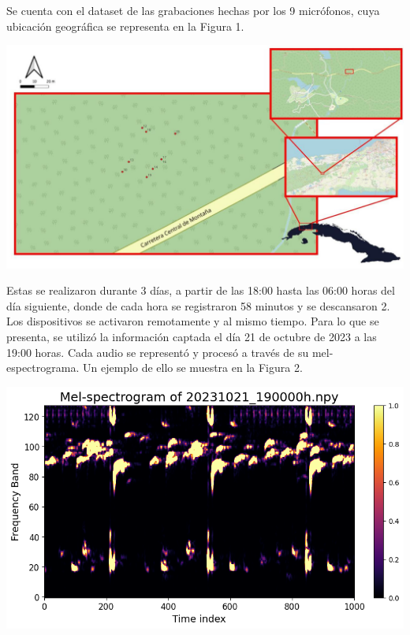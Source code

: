 \documentclass[a0,portrait]{a0poster}
\begin{document}
\begin{multicols}{3}
Se cuenta con el dataset de las grabaciones hechas
por los 9 micrófonos, cuya ubicación geográfica se representa en la Figura 1.

\begin{center}\vspace{0.1cm}
    \includegraphics[width=0.8\linewidth]{assets/mic_map.jpg}
\end{center}\vspace{0.1cm}
 
Estas se realizaron durante 3 días,
a partir de las 18:00 hasta las 06:00 horas del día siguiente, donde de cada hora se registraron 58 minutos
y se descansaron 2. Los dispositivos se activaron remotamente y al mismo tiempo. Para lo que se presenta, se utilizó la información captada el día 21 de octubre de 2023 a las 19:00 horas.
Cada audio se representó y procesó a través de su mel-espectrograma. \cite{mel} Un ejemplo de ello se muestra en la Figura 2.


\begin{center}\vspace{0.1cm}
    \includegraphics[width=0.8\linewidth]{assets/mel-spectrogram.png}
\end{center}\vspace{0.1cm}


\end{multicols}
\end{document}
